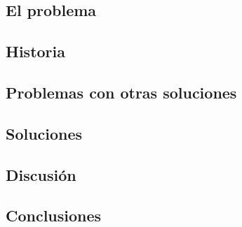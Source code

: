 \subsection{El problema}
\subsection{Historia}
\subsection{Problemas con otras soluciones}
\subsection{Soluciones}
\subsection{Discusión}
\subsection{Conclusiones}

